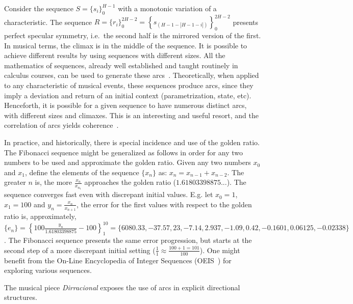 Consider the sequence $S=\{s_i\}_0^{H-1}$ with a monotonic variation of a characteristic.
The sequence
$R=\{r_i\}_0^{2H -2}=\left\{s_{(H-1-|H-1-i|)}\right\}_0^{2H-2}$
presents perfect specular symmetry, i.e.\ the second half is the
mirrored version of the first. In musical terms, the climax is
in the middle of the sequence. It is possible to achieve different results
by using sequences with different sizes. All the mathematics of
sequences, already well established and taught routinely in calculus courses, can be used to generate these arcs~\cite{Guidorizzo,Schoenberg}.
Theoretically, when applied to any characteristic of musical events,
these sequences produce arcs, since they imply a deviation and return of an initial context (parametrization, state, etc).
Henceforth, it is possible for a given sequence to have
numerous distinct arcs, with different sizes and climaxes. 
This is an interesting and useful resort, and the correlation of arcs yields coherence~\cite{Salzer}.

In practice, and historically, there is special incidence and use of the golden ratio.
The Fibonacci sequence might be generalized as follows in order for any two numbers to be used
and approximate the golden ratio.
Given any two numbers $x_0$
and $x_1$, define the elements of the sequence $\{x_n\}$ as: $x_n=x_{n-1}+x_{n-2}$.
The greater $n$ is, the more $\frac{x_{n}}{x_{n_1}}$ approaches the golden ratio
($1.61803398875...$). The sequence converges fast even with discrepant
initial values.
E.g. let $x_0=1$, $x_1=100$ and $y_n=\frac{x_n}{x_{n+1}}$, the error for the first values with
respect to the golden ratio is, approximately, $\{ e_n \}
=\left\{100\frac{y_n}{1.61803398875}-100 \right\}_1^{10}=\{6080.33, -37.57, 23,
-7.14, 2.937, -1.09, 0.42, -0.1601, 0.06125, -0.02338\}$. The Fibonacci sequence
presents the same error progression, but starts at the second step of a more discrepant initial setting
($\frac{1}{1}\approx\frac{100+1 = 101}{100}$).
One might benefit from the On-Line Encyclopedia of Integer Sequences (OEIS~\cite{oeis})
for exploring various sequences.

The musical piece \emph{Dirracional} exposes the use of arcs in explicit directional structures.~\cite{MASSA}

